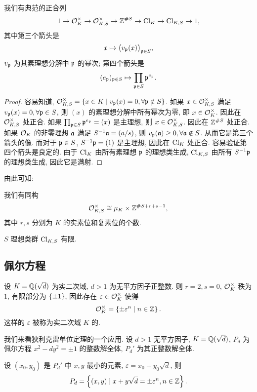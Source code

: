 \begin{proposition}{}{}
我们有典范的正合列
	\[1\rightarrow{\mathcal{O}}_K^\times\rightarrow{\mathcal{O}}_{K,S}^\times\rightarrow{\mathbb{Z}}^{\#S}\rightarrow{\mathrm{Cl}}_K\rightarrow{\mathrm{Cl}}_{K,S}\rightarrow 1,\]
其中第三个箭头是
	\[x\mapsto \bigl(v_{\mathfrak{p}}(x)\bigr)_{{\mathfrak{p}}\in S},\]
$v_{\mathfrak{p}}$ 为其素理想分解中 ${\mathfrak{p}}$ 的幂次; 第四个箭头是
	\[(e_{\mathfrak{p}})_{{\mathfrak{p}}\in S}\mapsto \prod_{{\mathfrak{p}}\in S}{\mathfrak{p}}^{e_{\mathfrak{p}}}.\]
\end{proposition}
\begin{proof}
容易知道, ${\mathcal{O}}_{K,S}^\times=\left\{x\in K\mid v_{\mathfrak{p}}(x)=0,\forall {\mathfrak{p}}\notin S\right\}$.
如果 $x\in{\mathcal{O}}_{K,S}^\times$ 满足 $v_{\mathfrak{p}}(x)=0,\forall {\mathfrak{p}}\in S$, 则 $(x)$ 的素理想分解中所有幂次为零, 即 $x\in{\mathcal{O}}_K^\times$. 因此在 ${\mathcal{O}}_{K,S}^\times$ 处正合. 
如果 $\prod_{{\mathfrak{p}}\in S}{\mathfrak{p}}^{e_{\mathfrak{p}}}=(x)$ 是主理想, 则 $x\in{\mathcal{O}}_{K,S}^\times$. 因此在 ${\mathbb{Z}}^{\#S}$ 处正合.
如果 ${\mathcal{O}}_K$ 的非零理想 ${\mathfrak{a}}$ 满足 $S^{-1}{\mathfrak{a}}=(a/s)$, 则 $v_{\mathfrak{p}}({\mathfrak{a}})\ge 0,\forall {\mathfrak{a}}\notin S$. 从而它是第三个箭头的像. 而对于 ${\mathfrak{p}}\in S$, $S^{-1}{\mathfrak{p}}=(1)$ 是主理想, 因此在 ${\mathrm{Cl}}_K$ 处正合.
容易验证第四个箭头是良定的. 由于 ${\mathrm{Cl}}_K$ 由所有素理想 ${\mathfrak{p}}$ 的理想类生成, ${\mathrm{Cl}}_{K,S}$ 由所有 $S^{-1}{\mathfrak{p}}$ 的理想类生成, 因此它是满射.
\end{proof}

由此可知:
\begin{corollary}{}{}
我们有同构
	\[{\mathcal{O}}_{K,S}^\times\cong\mu_K\times{\mathbb{Z}}^{\#S+r+s-1},\]
其中 $r,s$ 分别为 $K$ 的实素位和复素位的个数.
\end{corollary}
\begin{corollary}{}{}
$S$ 理想类群 ${\mathrm{Cl}}_{K,S}$ 有限.
\end{corollary}





\subsection{佩尔方程}

设 $K={\mathbb{Q}}(\sqrt{d})$ 为实二次域, $d>1$ 为无平方因子正整数. 则 $r=2,s=0$, ${\mathcal{O}}_K^\times$ 秩为 $1$, 有限部分为 $\left\{\pm1\right\}$, 因此存在 $\varepsilon\in{\mathcal{O}}_K^\times$ 使得
  \[{\mathcal{O}}_K^\times=\left\{\pm \varepsilon^n\mid n\in {\mathbb{Z}}\right\}.\]
这样的 $\varepsilon$ 被称为实二次域 $K$ 的.

我们来看狄利克雷单位定理的一个应用. 设 $d>1$ 无平方因子, $K={\mathbb{Q}}(\sqrt{d})$, $P_d$ 为佩尔方程 $x^2-dy^2=\pm 1$ 的整数解全体, $P_d'$ 为其正整数解全体.
\begin{proposition}{}{}
设 $(x_0,y_0)$ 是 $P_d'$ 中 $x,y$ 最小的元素, $\varepsilon=x_0+y_0\sqrt{d}$, 则
  \[P_d=\left\{(x,y)\mid x+y\sqrt{d}=\pm\varepsilon^n, n\in{\mathbb{Z}}\right\}.\]
\end{proposition}

